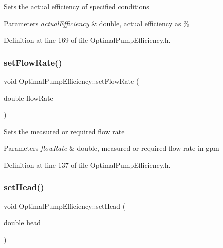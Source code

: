 Sets the actual efficiency of specified conditions 
\begin{DoxyParams}{Parameters}
{\em actual\+Efficiency} & double, actual efficiency as \% \\
\hline
\end{DoxyParams}


Definition at line 169 of file Optimal\+Pump\+Efficiency.\+h.

\mbox{\label{class_optimal_pump_efficiency_a90067b57c559fd3274fb8d6e00f6221d}} 
\subsubsection{\texorpdfstring{set\+Flow\+Rate()}{setFlowRate()}}
{\footnotesize\ttfamily void Optimal\+Pump\+Efficiency\+::set\+Flow\+Rate (\begin{DoxyParamCaption}\item[{double}]{flow\+Rate }\end{DoxyParamCaption})\hspace{0.3cm}{\ttfamily [inline]}}

Sets the measured or required flow rate 
\begin{DoxyParams}{Parameters}
{\em flow\+Rate} & double, measured or required flow rate in gpm \\
\hline
\end{DoxyParams}


Definition at line 137 of file Optimal\+Pump\+Efficiency.\+h.

\mbox{\label{class_optimal_pump_efficiency_ac317c900ec68797cf051977147ea33da}} 
\subsubsection{\texorpdfstring{set\+Head()}{setHead()}}
{\footnotesize\ttfamily void Optimal\+Pump\+Efficiency\+::set\+Head (\begin{DoxyParamCaption}\item[{double}]{head }\end{DoxyParamCaption})\hspace{0.3cm}{\ttfamily [inline]}}

